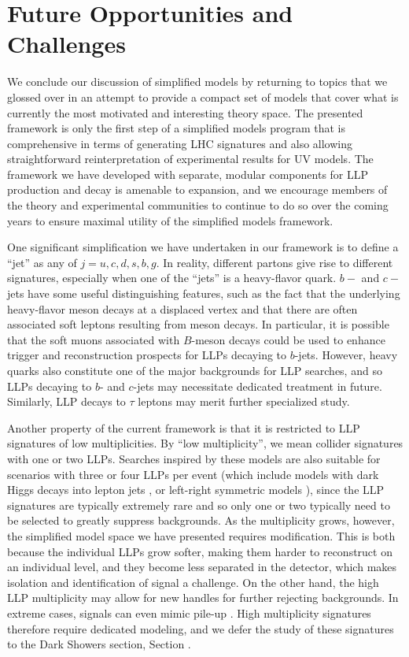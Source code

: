 \section{Future Opportunities and Challenges}\label{sec:simplified_future}

We conclude our discussion of simplified models by returning to topics that we glossed over in an attempt to provide a compact set of models that cover what is currently the most motivated and interesting theory space. The presented framework is only the first step of a simplified models program that is comprehensive in terms of generating LHC signatures and also allowing straightforward reinterpretation of experimental results for UV models. The framework we have developed with separate, modular components for LLP production and decay is amenable to expansion, and we encourage members of the theory and experimental communities to continue to do so over the coming years to ensure maximal utility of the simplified models framework.

One significant simplification we have undertaken in our framework is to define a ``jet'' as any of $j=u,c,d,s,b,g$. In reality, different partons give rise to different signatures, especially when one of the ``jets'' is a heavy-flavor quark. $b-$ and $c-$jets have some useful distinguishing features, such as the fact that the underlying heavy-flavor meson decays at a displaced vertex and that there are often associated soft leptons resulting from meson decays. In particular, it is possible that the soft muons associated with $B$-meson decays could be used to enhance trigger and reconstruction prospects for LLPs decaying to $b$-jets. However, heavy quarks also constitute one of the major backgrounds for LLP searches, and so LLPs decaying to $b$- and $c$-jets may necessitate dedicated treatment in future. Similarly, LLP decays to $\tau$ leptons may merit further specialized study.

Another property of the current framework is that it is restricted to LLP signatures of low multiplicities. By ``low multiplicity'', we mean collider signatures with one or two LLPs. Searches inspired by these models are also suitable for scenarios with three or four LLPs per event (which include models with dark Higgs decays into lepton jets \cite{Falkowski:2010cm}, or left-right symmetric models \cite{Nemevsek:2016enw}), since the LLP signatures are typically extremely rare and so only one or two typically need to be selected to greatly suppress backgrounds. As the multiplicity grows, however, the simplified model space we have presented requires modification. This is both because the individual LLPs grow softer, making them harder to reconstruct on an individual level, and they become less separated in the detector, which makes isolation and identification of signal a challenge. On the other hand, the high LLP multiplicity may allow for new handles for further rejecting backgrounds. In extreme cases, signals can even mimic pile-up \cite{Knapen:2016hky}. High multiplicity signatures therefore require dedicated modeling, and we defer the study of these signatures to the Dark Showers section, Section \cite{sec:showers}.

